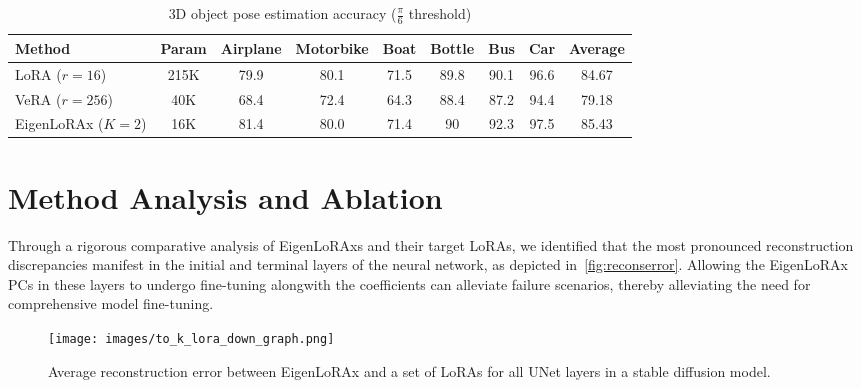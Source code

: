 \begin{table}[!ht]
    \centering
        \caption{3D object pose estimation accuracy ($\frac{\pi}{6}$ threshold)}
    \begin{tabular}{lcccccccc}
    \toprule
        Method & Param & Airplane & Motorbike & Boat & Bottle & Bus & Car & Average \\ 
        \midrule
        LoRA ($r=16$) & 215K & 79.9 & 80.1 & 71.5 & 89.8 & 90.1 & 96.6 & 84.67 \\ 
        VeRA ($r=256$) & 40K & 68.4 & 72.4 & 64.3 & 88.4 & 87.2 & 94.4 & 79.18 \\ 
        EigenLoRAx ($K=2$) & 16K & 81.4 & 80.0 & 71.4 & 90 & 92.3 & 97.5 & 85.43 \\ 
        \bottomrule
    \end{tabular}
\end{table}
\FloatBarrier
\section{Method Analysis and Ablation}
\label{sec:ablation}
Through a rigorous comparative analysis of EigenLoRAxs and their target LoRAs, we identified that the most pronounced reconstruction discrepancies manifest in the initial and terminal layers of the neural network, as depicted in~\autoref{fig:reconserror}. Allowing the EigenLoRAx PCs in these layers to undergo fine-tuning alongwith the coefficients can alleviate failure scenarios, thereby alleviating the need for comprehensive model fine-tuning.
\begin{figure}[h]
  \begin{center}
    \texttt{[image: images/to\_k\_lora\_down\_graph.png]}
  \end{center}
  \caption{\small{Average reconstruction error between EigenLoRAx and a set of LoRAs for all UNet layers in a stable diffusion model.}}
  \label{fig:reconserror}
\end{figure}

